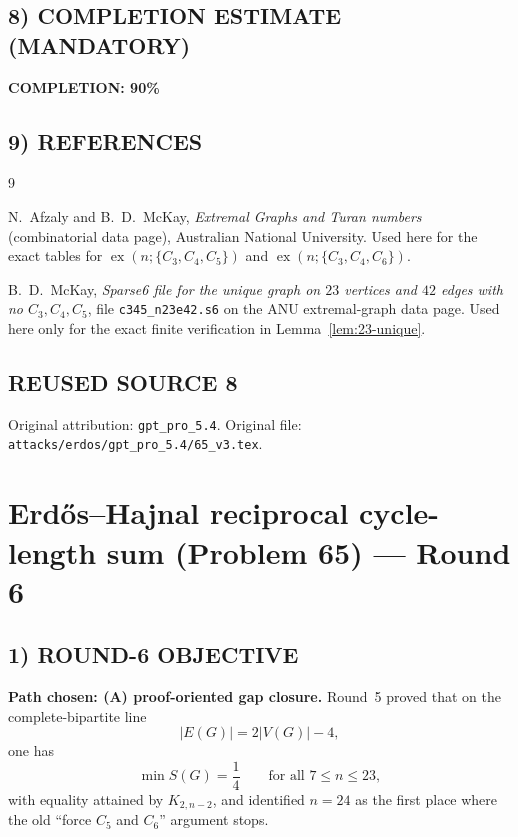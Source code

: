 \subsection*{8) COMPLETION ESTIMATE (MANDATORY)}

\textbf{COMPLETION: 90\%}

\subsection*{9) REFERENCES}

\begin{thebibliography}{9}

N.~Afzaly and B.~D.~McKay,
\emph{Extremal Graphs and Turan numbers} (combinatorial data page),
Australian National University.
Used here for the exact tables for
$\operatorname{ex}(n;\{C_3,C_4,C_5\})$ and
$\operatorname{ex}(n;\{C_3,C_4,C_6\})$.

B.~D.~McKay,
\emph{Sparse6 file for the unique graph on $23$ vertices and $42$ edges with no $C_3,C_4,C_5$},
file \texttt{c345\_n23e42.s6} on the ANU extremal-graph data page.
Used here only for the exact finite verification in Lemma~\ref{lem:23-unique}.

\end{thebibliography}


\subsection*{REUSED SOURCE 8}
Original attribution: \texttt{gpt\_pro\_5.4}.
Original file: \texttt{attacks/erdos/gpt\_pro\_5.4/65\_v3.tex}.

\section{Erd\H{o}s--Hajnal reciprocal cycle-length sum (Problem 65) --- Round 6}

\subsection*{1) ROUND-6 OBJECTIVE}

\textbf{Path chosen: (A) proof-oriented gap closure.}
Round~5 proved that on the complete-bipartite line
\[
|E(G)|=2|V(G)|-4,
\]
one has
\[
\min S(G)=\frac14
\qquad\text{for all }7\le n\le 23,
\]
with equality attained by $K_{2,n-2}$, and identified $n=24$ as the first place where the old ``force $C_5$ and $C_6$'' argument stops.


